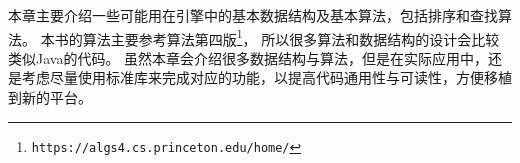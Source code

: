 本章主要介绍一些可能用在引擎中的基本数据结构及基本算法，包括排序和查找算法。
本书的算法主要参考算法第四版\footnote{\nolinkurl{https://algs4.cs.princeton.edu/home/}}，
所以很多算法和数据结构的设计会比较类似Java的代码。
虽然本章会介绍很多数据结构与算法，但是在实际应用中，还是考虑尽量使用标准库来完成对应的功能，以提高代码通用性与可读性，方便移植到新的平台。
